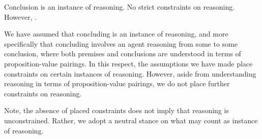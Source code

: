 \begin{note}
  \color{blue}
  Conclusion is an instance of reasoning.
  No strict constraints on reasoning.
  However, \tR{}.
\end{note}

\begin{note}
  We have assumed that concluding is an instance of reasoning, and more specifically that concluding involves an agent reasoning from some \poP{} to some conclusion, where both premises and conclusions are understood in terms of proposition-value pairings.
  In this respect, the assumptions we have made place constraints on certain instances of reasoning.
  However, aside from understanding reasoning in terms of proposition-value pairings, we do not place further constraints on reasoning.

  Note, the absence of placed constraints does not imply that reasoning is unconstrained.
  Rather, we adopt a neutral stance on what may count as instance of reasoning.
\end{note}

